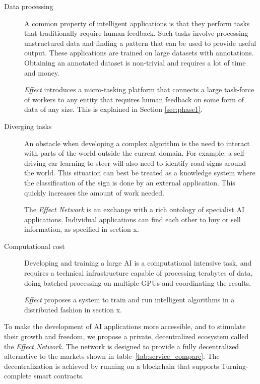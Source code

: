 \documentclass{article}
\begin{document}
\begin{description}
\item[Data processing] A common property of intelligent applications
  is that they perform tasks that traditionally require human
  feedback. Such tasks involve processing unstructured data and
  finding a pattern that can be used to provide useful output. These
  applications are trained on large datasets with annotations. Obtaining
  an annotated dataset is non-trivial and requires a lot of time and
  money.
  
  \emph{Effect} introduces a micro-tasking platform that connects a 
  large task-force of workers to any entity that requires human feedback 
  on some form of data of any size. This is explained in Section \ref{sec:phase1}.
  
\item[Diverging tasks] An obstacle when developing a complex
  algorithm is the need to interact with parts of the world outside
  the current domain. For example: a self-driving car learning to steer 
  will also need to identify road signs around the world. This
  situation can best be treated as a knowledge system where the
  classification of the sign is done by an external application. This
  quickly increases the amount of work needed.
  
  The \emph{Effect Network} is an exchange with a rich ontology of 
  specialist AI applications. Individual applications can find each 
  other to buy or sell information, as specified in section x.
  
\item[Computational cost] Developing and training a large AI is a
  computational intensive task, and requires a technical
  infrastructure capable of processing terabytes of data, doing
  batched processing on multiple GPUs and coordinating the results. 
  
  \emph{Effect} proposes a system to train and run intelligent 
  algorithms in a distributed fashion in section x.
\end{description}

To make the development of AI applications more accessible, and to
stimulate their growth and freedom, we propose a private,
decentralized ecosystem called the \emph{Effect Network}. The network
is designed to provide a fully decentralized alternative to the
markets shown in table~\ref{tab:service_compare}. The decentralization
is achieved by running on a blockchain that supports Turning-complete
smart contracts.\\
\end{document}
